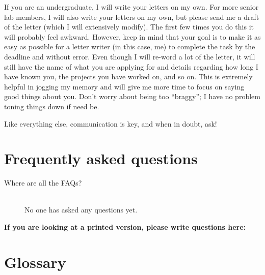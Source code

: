 \documentclass[letterpaper,12pt,oneside]{memoir}
\begin{document}
If you are an undergraduate, I will write your letters on my own. For more senior lab members, I will also write your letters on my own, but please send me a draft of the letter (which I will extensively modify). The first few times you do this it will probably feel awkward. However, keep in mind that your goal is to make it as easy as possible for a letter writer (in this case, me) to complete the task by the deadline and without error. Even though I will re-word a lot of the letter, it will still have the name of what you are applying for and details regarding how long I have known you, the projects you have worked on, and so on. This is extremely helpful in jogging my memory and will give me more time to focus on saying good things about you. Don't worry about being too ``braggy''; I have no problem toning things down if need be.

Like everything else, communication is key, and when in doubt, ask!

\chapter{Frequently asked questions}

\begin{description}
\item[Where are all the FAQs?] \hfill \\
No one has asked any questions yet.


\end{description}

\vspace{.2in}
\noindent \textbf{\large If you are looking at a printed version, please write questions here:}


%

\chapter{Glossary}
\end{document}
